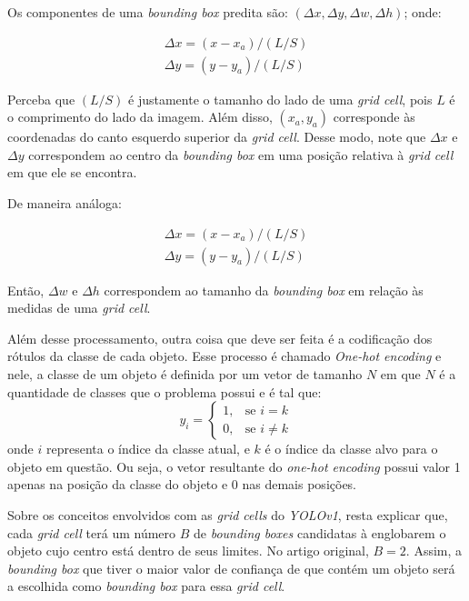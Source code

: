 Os componentes de uma \emph{bounding box} predita são: $(\Delta{x}, \Delta{y}, \Delta{w}, \Delta{h})$; onde:

\begin{align}
\Delta{x} = \left(x - x_a \right) / \left( L / S\right)\\
\Delta{y} = \left(y - y_a \right) / \left( L / S\right)
\end{align}

Perceba que $\left( L / S\right)$ é justamente o tamanho do lado de uma \emph{grid cell}, pois $L$ é o comprimento do lado da imagem. Além disso, $(x_a, y_a)$ corresponde às coordenadas do canto esquerdo superior da \emph{grid cell}. Desse modo, note que $\Delta{x}$ e $\Delta{y}$ correspondem ao centro da \emph{bounding box} em uma posição relativa à \emph{grid cell} em que ele se encontra.

De maneira análoga:

\begin{align}
\Delta{x} = \left(x - x_a \right) / \left( L / S\right)\\
\Delta{y} = \left(y - y_a \right) / \left( L / S\right)
\end{align}

Então, $\Delta{w}$ e $\Delta{h}$ correspondem ao tamanho da \emph{bounding box} em relação às medidas de uma \emph{grid cell}.

Além desse processamento, outra coisa que deve ser feita é a codificação dos rótulos da classe de cada objeto. Esse processo é chamado \emph{One-hot encoding} e nele, a classe de um objeto é definida por um vetor de tamanho $N$ em que $N$ é a quantidade de classes que o problema possui e é tal que:
\begin{equation}
y_i = 
\begin{cases} 
1, & \text{se } i = k \\
0, & \text{se } i \neq k 
\end{cases}
\end{equation}
onde $i$ representa o índice da classe atual, e $k$ é o índice da classe alvo para o objeto em questão. Ou seja, o vetor resultante do \emph{one-hot encoding} possui valor 1 apenas na posição da classe do objeto e 0 nas demais posições.

Sobre os conceitos envolvidos com as \emph{grid cells} do \emph{YOLOv1}, resta explicar que, cada \emph{grid cell} terá um número $B$ de \emph{bounding boxes} candidatas à englobarem o objeto cujo centro está dentro de seus limites. No artigo original, $B = 2$. Assim, a \emph{bounding box} que tiver o maior valor de confiança de que contém um objeto será a escolhida como \emph{bounding box} para essa \emph{grid cell}.


